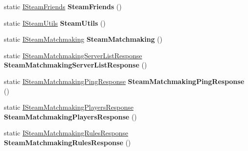 \begin{DoxyCompactItemize}
static \hyperlink{class_valve_1_1_steamworks_1_1_i_steam_friends}{I\+Steam\+Friends} {\bfseries Steam\+Friends} ()
\item 
\mbox{\label{class_valve_1_1_steamworks_1_1_steam_a_p_i_a92f204ee8c970c5f026b04f074943b4b}} 
static \hyperlink{class_valve_1_1_steamworks_1_1_i_steam_utils}{I\+Steam\+Utils} {\bfseries Steam\+Utils} ()
\item 
\mbox{\label{class_valve_1_1_steamworks_1_1_steam_a_p_i_a9ce4b71a247d6a4ed67331948f518b53}} 
static \hyperlink{class_valve_1_1_steamworks_1_1_i_steam_matchmaking}{I\+Steam\+Matchmaking} {\bfseries Steam\+Matchmaking} ()
\item 
\mbox{\label{class_valve_1_1_steamworks_1_1_steam_a_p_i_a2442f7505c4ea8e32ced61bb82e41249}} 
static \hyperlink{class_valve_1_1_steamworks_1_1_i_steam_matchmaking_server_list_response}{I\+Steam\+Matchmaking\+Server\+List\+Response} {\bfseries Steam\+Matchmaking\+Server\+List\+Response} ()
\item 
\mbox{\label{class_valve_1_1_steamworks_1_1_steam_a_p_i_a6b9749c088c07f6cbb23a0bf32f8210d}} 
static \hyperlink{class_valve_1_1_steamworks_1_1_i_steam_matchmaking_ping_response}{I\+Steam\+Matchmaking\+Ping\+Response} {\bfseries Steam\+Matchmaking\+Ping\+Response} ()
\item 
\mbox{\label{class_valve_1_1_steamworks_1_1_steam_a_p_i_a1da1b26b94e3446d9cd3bb344eb004b0}} 
static \hyperlink{class_valve_1_1_steamworks_1_1_i_steam_matchmaking_players_response}{I\+Steam\+Matchmaking\+Players\+Response} {\bfseries Steam\+Matchmaking\+Players\+Response} ()
\item 
\mbox{\label{class_valve_1_1_steamworks_1_1_steam_a_p_i_a892f52c70e8185ecf36d546e54390471}} 
static \hyperlink{class_valve_1_1_steamworks_1_1_i_steam_matchmaking_rules_response}{I\+Steam\+Matchmaking\+Rules\+Response} {\bfseries Steam\+Matchmaking\+Rules\+Response} ()
\item 
\mbox{\label{class_valve_1_1_steamworks_1_1_steam_a_p_i_adcfb73ac9e5ffeedb2b7cf1b175b8d47}} 

\end{DoxyCompactItemize}

